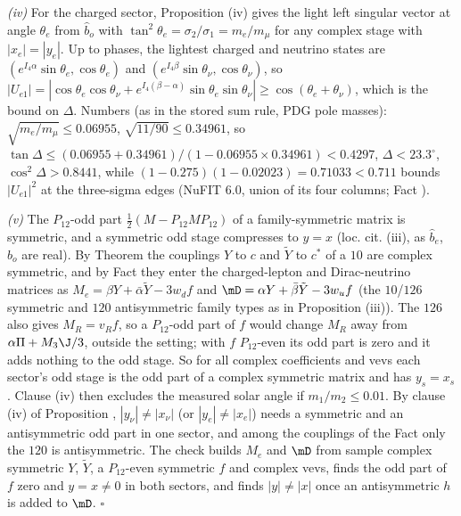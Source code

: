 \emph{(iv)} For the charged sector, Proposition (iv) gives the light left singular vector at angle $\theta_{e}$ from $\hat{b}_{o}$ with $\tan^{2}\theta_{e} = \sigma_{2}/\sigma_{1} = m_{e}/m_{\mu}$ for any complex stage with $|x_{e}| = |y_{e}|$. Up to phases, the lightest charged and neutrino states are $(e^{I_{4}\alpha}\sin\theta_{e}, \cos\theta_{e})$ and $(e^{I_{4}\beta}\sin\theta_{\nu}, \cos\theta_{\nu})$, so $|U_{e1}| = |\cos\theta_{e}\cos\theta_{\nu} + e^{I_{4}(\beta - \alpha)}\sin\theta_{e}\sin\theta_{\nu}| \ge \cos(\theta_{e} + \theta_{\nu})$, which is the bound on $\Delta$. Numbers (as in the stored sum rule, PDG pole masses): $\sqrt{m_{e}/m_{\mu}} \le 0.06955$, $\sqrt{11/90} \le 0.34961$, so $\tan\Delta \le (0.06955 + 0.34961)/(1 - 0.06955 \times 0.34961) < 0.4297$, $\Delta < 23.3^{\circ}$, $\cos^{2}\Delta > 0.8441$, while $(1 - 0.275)(1 - 0.02023) = 0.71033 < 0.711$ bounds $|U_{e1}|^{2}$ at the three-sigma edges (NuFIT 6.0, union of its four columns; Fact ).

\emph{(v)} The $P_{12}$-odd part $\tfrac12(M - P_{12}MP_{12})$ of a family-symmetric matrix is symmetric, and a symmetric odd stage compresses to $y = x$ (loc. cit. (iii), as $\hat{b}_{e}$, $\hat{b}_{o}$ are real). By Theorem  the couplings $Y$ to $c$ and $\tilde{Y}$ to $c^{*}$ of a $10$ are complex symmetric, and by Fact  they enter the charged-lepton and Dirac-neutrino matrices as $M_{e} = \beta Y + \bar{\alpha}\tilde{Y} - 3w_{d}f$ and $\mD = \alpha Y + \bar{\beta}\tilde{Y} - 3w_{u}f$ (the $10$/$126$ symmetric and $120$ antisymmetric family types as in Proposition (iii)). The $126$ also gives $M_{R} = v_{R}f$, so a $P_{12}$-odd part of $f$ would change $M_{R}$ away from $\alpha\Pi + M_{3}\J/3$, outside the setting; with $f$ $P_{12}$-even its odd part is zero and it adds nothing to the odd stage. So for all complex coefficients and vevs each sector's odd stage is the odd part of a complex symmetric matrix and has $y_{s} = x_{s}$. Clause (iv) then excludes the measured solar angle if $m_{1}/m_{2} \le 0.01$. By clause (iv) of Proposition , $|y_{\nu}| \ne |x_{\nu}|$ (or $|y_{e}| \ne |x_{e}|$) needs a symmetric and an antisymmetric odd part in one sector, and among the couplings of the Fact only the $120$ is antisymmetric. The check builds $M_{e}$ and $\mD$ from sample complex symmetric $Y$, $\tilde{Y}$, a $P_{12}$-even symmetric $f$ and complex vevs, finds the odd part of $f$ zero and $y = x \ne 0$ in both sectors, and finds $|y| \ne |x|$ once an antisymmetric $h$ is added to $\mD$. $\square$
